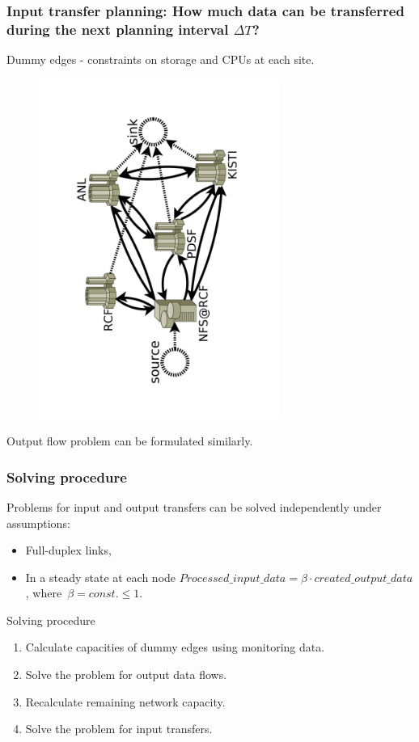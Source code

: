 \documentclass{beamer}
\begin{document}
\begin{frame}\frametitle{Input transfer planning: How much data can be transferred during the next planning interval $\Delta T$?}
Dummy edges - constraints on  storage and CPUs at each site.
\begin{figure}[h]
	\begin{center}
		\includegraphics [trim= 30mm 30mm 30mm 30mm , clip, angle =-90, width=0.7\textwidth]{pic/real_network.pdf}
	\end{center}
	\label{real_network}
\end{figure} 
\vspace{-3mm}
Output flow problem can be formulated similarly.
\end{frame}

\begin{frame}\frametitle{Solving procedure}
\begin{block}{}
Problems for input and output transfers can be solved independently under assumptions: 
\begin{itemize}
\item Full-duplex links,
\item In a steady state at each node $Processed\_input\_data= \beta \cdot created\_output\_data$, where~$\beta = const.\leq 1$.
\end{itemize}
\end{block} 

\begin{block}{Solving procedure}
\begin{enumerate}
\item Calculate capacities of dummy edges using monitoring data.
\item Solve the problem for output data flows.
\item Recalculate remaining network capacity.
\item Solve the problem for input transfers.
\end{enumerate}
\end{block}    
\end{frame}
\end{document}
